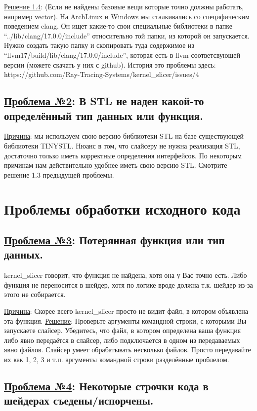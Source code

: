 \documentclass[11pt,fleqn,english,russian]{report} %
\begin{document}
\vspace*{5px}
\noindent\underline{Решение 1.4}: (Если не найдены базовые вещи которые точно должны работать, например vector). На ArchLinux и Windows мы сталкивались со специфическим поведением clang. Он ищет какие-то свои специальные библиотеки в папке ``../lib/clang/17.0.0/include'' относительно той папки, из которой он запускается. Нужно создать такую папку и скопировать туда содержимое из ``llvm17/build/lib/clang/17.0.0/include'', которая есть в llvm соответсвующей версии (можете скачать у них с github). История это проблемы здесь: https://github.com/Ray-Tracing-Systems/kernel\_slicer/issues/4

\subsection{\underline{Проблема №2}: В STL не наден какой-то определённый тип данных или функция.}

\noindent\underline{Причина}: мы используем свою версию библиотеки STL на базе существующей библиотеки TINYSTL. Нюанс в том, что слайсеру не нужна реализация STL, достаточно только иметь корректные определения интерфейсов. По некоторым причинам нам действительно удобнее иметь свою версию STL. Смотрите решение 1.3 предыдущей проблемы.

\section{Проблемы обработки исходного кода}

\subsection{\underline{Проблема №3}: Потерянная функция или тип данных.} kernel\_slicer говорит, что функция не найдена, хотя она у Вас точно есть. Либо функция не переносится в шейдер, хотя по логике вроде должна т.к. шейдер из-за этого не собирается.

\noindent\underline{Причина}: Скорее всего kernel\_slicer просто не видит файл, в котором объявлена эта функция. \underline{Решение}: Проверьте аргументы командной строки, с которыми Вы запускаете слайсер. Убедитесь, что файл, в котором определена ваша функция либо явно передаётся в слайсер, либо подключается в одном из передаваемых явно файлов. Слайсер умеет обрабатывать несколько файлов. Просто передавайте их как 1, 2, 3 и т.п. аргументы командной строки разделённые проблелом.  

\subsection{\underline{Проблема №4}: Некоторые строчки кода в шейдерах съедены/испорчены.}
\end{document}
